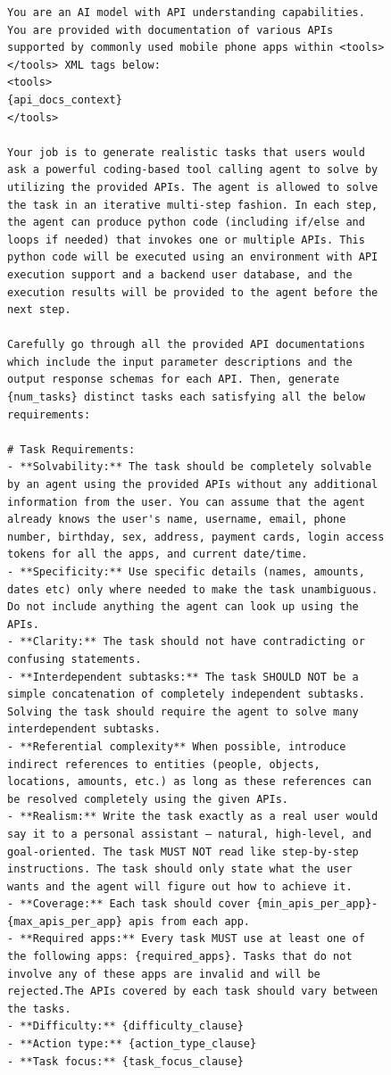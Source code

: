 \begin{figure}[t]
\begin{lstlisting}[style=prettyprompt, captionpos=b, caption={Task generation prompt.}, label={lst:taskgen_prompt}]
You are an AI model with API understanding capabilities. You are provided with documentation of various APIs supported by commonly used mobile phone apps within <tools></tools> XML tags below:
<tools>
{api_docs_context}
</tools>

Your job is to generate realistic tasks that users would ask a powerful coding-based tool calling agent to solve by utilizing the provided APIs. The agent is allowed to solve the task in an iterative multi-step fashion. In each step, the agent can produce python code (including if/else and loops if needed) that invokes one or multiple APIs. This python code will be executed using an environment with API execution support and a backend user database, and the execution results will be provided to the agent before the next step.

Carefully go through all the provided API documentations which include the input parameter descriptions and the output response schemas for each API. Then, generate {num_tasks} distinct tasks each satisfying all the below requirements:

# Task Requirements:
- **Solvability:** The task should be completely solvable by an agent using the provided APIs without any additional information from the user. You can assume that the agent already knows the user's name, username, email, phone number, birthday, sex, address, payment cards, login access tokens for all the apps, and current date/time.
- **Specificity:** Use specific details (names, amounts, dates etc) only where needed to make the task unambiguous. Do not include anything the agent can look up using the APIs.
- **Clarity:** The task should not have contradicting or confusing statements.
- **Interdependent subtasks:** The task SHOULD NOT be a simple concatenation of completely independent subtasks. Solving the task should require the agent to solve many interdependent subtasks.
- **Referential complexity** When possible, introduce indirect references to entities (people, objects, locations, amounts, etc.) as long as these references can be resolved completely using the given APIs.
- **Realism:** Write the task exactly as a real user would say it to a personal assistant — natural, high-level, and goal-oriented. The task MUST NOT read like step-by-step instructions. The task should only state what the user wants and the agent will figure out how to achieve it.
- **Coverage:** Each task should cover {min_apis_per_app}-{max_apis_per_app} apis from each app.
- **Required apps:** Every task MUST use at least one of the following apps: {required_apps}. Tasks that do not involve any of these apps are invalid and will be rejected.The APIs covered by each task should vary between the tasks.
- **Difficulty:** {difficulty_clause}
- **Action type:** {action_type_clause}
- **Task focus:** {task_focus_clause}


\end{lstlisting}
\end{figure}
